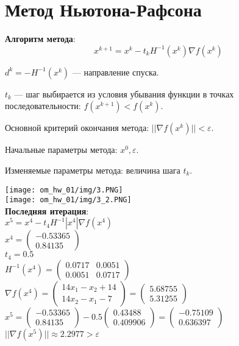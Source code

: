 \section{Метод Ньютона-Рафсона}

\textbf{Алгоритм метода}:
$$ x^{k + 1} = x^{k} - t_{k}H^{-1}(x^{k})\nabla f(x^{k}) $$

$d^{k} = -H^{-1}(x^{k})$ --- направление спуска.

$t_{k}$ --- шаг выбирается из условия убывания функции в точках последовательности: $f(x^{k + 1}) < f(x^{k})$.

Основной критерий окончания метода: $||\nabla f(x^{k})|| < \varepsilon$.

Начальные параметры метода: $x^{0}, \varepsilon$.

Изменяемые параметры метода: величина шага $t_{k}$.

\texttt{[image: om\_hw\_01/img/3.PNG]}\\
\texttt{[image: om\_hw\_01/img/3\_2.PNG]}\\

\textbf{Последняя итерация}:\\
$x^{5} = x^{4} - t_{4}H^{-1}|x^{4}| \nabla f(x^{4})$\\
$x^{4} = 
\begin{pmatrix}
  -0.53365\\
  0.84135
\end{pmatrix}
$\\

$t_{4} = 0.5$\\
$
H^{-1}(x^{4}) = 
\begin{pmatrix}
  0.0717 & 0.0051\\
  0.0051 & 0.0717
\end{pmatrix}
$\\

$
\nabla f(x^{4}) = 
\begin{pmatrix}
  14x_{1} - x_{2} + 14\\
  14x_{2} - x_{1} - 7
\end{pmatrix}
=
\begin{pmatrix}
  5.68755\\
  5.31255
\end{pmatrix}
$\\

$
x^{5} = 
\begin{pmatrix}
  -0.53365\\
  0.84135
\end{pmatrix}
-
0.5
\begin{pmatrix}
  0.43488\\
  0.409906
\end{pmatrix}
=
\begin{pmatrix}
  -0.75109\\
  0.636397
\end{pmatrix}
$\\

$||\nabla f(x^{5})|| \approx 2.2977 > \varepsilon$

\pagebreak